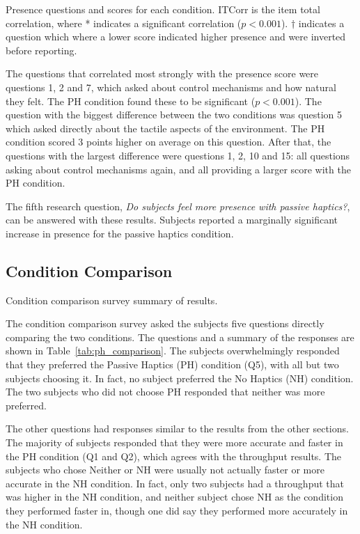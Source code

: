 \begin{sidewaystable}
    \centering
    \caption{Presence questions and scores for each condition. ITCorr is the item total correlation, where * indicates a significant correlation ($p<0.001$). $\dagger$ indicates a question which where a lower score indicated higher presence and were inverted before reporting.}
    \label{tab:ph_presence}
\end{sidewaystable}

The questions that correlated most strongly with the presence score were questions 1, 2 and 7, which asked about control mechanisms and how natural they felt.
The PH condition found these to be significant ($p<0.001$).
The question with the biggest difference between the two conditions was question 5 which asked directly about the tactile aspects of the environment.
The PH condition scored 3 points higher on average on this question.
After that, the questions with the largest difference were questions 1, 2, 10 and 15: all questions asking about control mechanisms again, and all providing a larger score with the PH condition.

The fifth research question, \textit{Do subjects feel more presence with passive haptics?}, can be answered with these results.
Subjects reported a marginally significant increase in presence for the passive haptics condition.

\subsection{Condition Comparison}

\begin{table}
    \centering
    \caption{Condition comparison survey summary of results.}
    \label{tab:ph_comparison}
\end{table}

The condition comparison survey asked the subjects five questions directly comparing the two conditions.
The questions and a summary of the responses are shown in Table~\ref{tab:ph_comparison}.
The subjects overwhelmingly responded that they preferred the Passive Haptics (PH) condition (Q5), with all but two subjects choosing it.
In fact, no subject preferred the No Haptics (NH) condition.
The two subjects who did not choose PH responded that neither was more preferred.

The other questions had responses similar to the results from the other sections.
The majority of subjects responded that they were more accurate and faster in the PH condition (Q1 and Q2), which agrees with the throughput results.
The subjects who chose Neither or NH were usually not actually faster or more accurate in the NH condition.
In fact, only two subjects had a throughput that was higher in the NH condition, and neither subject chose NH as the condition they performed faster in, though one did say they performed more accurately in the NH condition.

